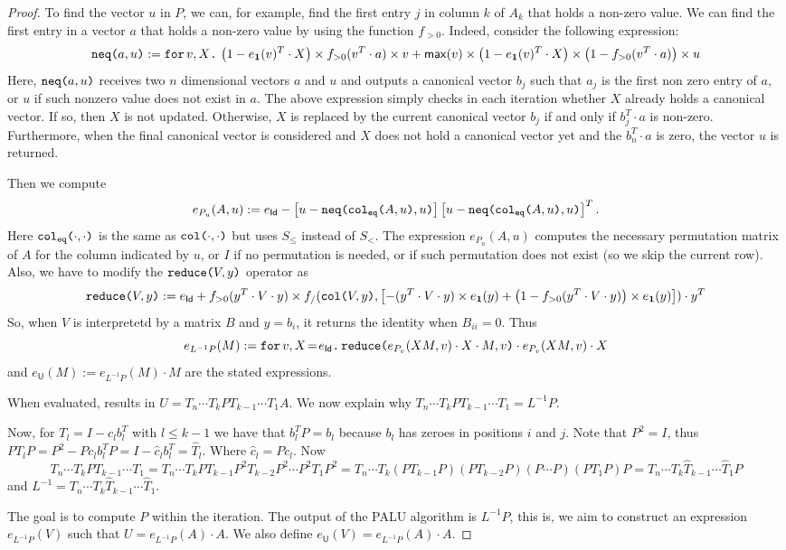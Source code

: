 \begin{proof}
To find the vector $u$ in $P$, we can, for example, find the first entry $j$ in column $k$ of $A_k$ that holds a non-zero value. We can find the first entry in a vector $a$ that holds a non-zero value by using the function $f_{>0}$. Indeed, consider the following expression:
$$
\nneq{a}{u}:=\ffor{v}{X}{\left( 1-e_{\ones}(v)^T\cdot X \right) \times f_{>0}(v^T\cdot a)\times v + \mathsf{max}(v)\times\left( 1-e_{\ones}(v)^T\cdot X \right)\times \left( 1 - f_{>0}(v^T\cdot a) \right) \times u}
$$
Here, $\nneq{a}{u}$ receives two $n$ dimensional vectors $a$ and $u$ and outputs a 
canonical vector $b_j$ such that $a_j$ is the first non zero entry of $a$, or $u$ if such nonzero value does not exist in $a$. The above expression simply checks in each iteration
whether $X$ already holds a canonical vector. If so, then $X$ is not updated. Otherwise,
$X$ is replaced by the current canonical vector $b_j$ if and only if $b_j^T\cdot a$ is non-zero. Furthermore, when the final canonical vector is considered and $X$ does not hold
a canonical vector yet and the $b_n^T\cdot a$ is zero, the vector $u$ is returned.

Then we compute 
$$
e_{P_u}(A,u) := e_{\mathsf{Id}} - \left[ u - \nneq{ \ccoleq{A}{u} }{u} \right]\left[ u - \nneq{ \ccoleq{A}{u} }{u} \right]^T.
$$ 
Here $\ccoleq{\cdot}{\cdot}$ is the same as $\ccol{\cdot}{\cdot}$ but uses $S_{\leq}$ instead of 
$S_{<}$. The expression $e_{P_u}(A,u)$ computes the necessary permutation matrix of $A$ for the column indicated by $u$, or $I$
if no permutation is needed, or if such permutation does not exist (so we skip the current row).
Also, we have to modify the $\red{V}{y}$ operator as 
$$
\red{V}{y}:= e_{\mathsf{Id}}+ f_{>0}(y^T\cdot V\cdot y)\times f_/(\ccol{V}{y},\left[ -(y^T\cdot V\cdot y)\times e_{\ones}(y) + \left( 1 - f_{>0}(y^T\cdot V\cdot y) \right)\times e_{\ones}(y) \right])\cdot y^T
$$
So, when $V$ is interpretetd by a  matrix $B$ and $y=b_i$, it returns the identity when $B_{ii}=0$.
Thus 
$$
e_{L^{-1}P}(M):=\initf{e_{\mathsf{Id}}}{v}{X}{\red{e_{P_v}(XM,v)\cdot X\cdot M}{v}\cdot e_{P_v}(XM,v)\cdot X}
$$
and $e_{\mathsf{U}}(M):=e_{L^{-1}P}(M)\cdot M$ are the stated expressions.

When evaluated,
results in $U=T_{n}\cdots T_kPT_{k-1}\cdots T_1A$. 
We now explain why $T_{n}\cdots T_kPT_{k-1}\cdots T_1 = L^{-1}P.$ 

Now, for $T_{l}=I-c_lb_l^T$ with $l\leq k-1$ we have that $b_l^TP=b_l$ because $b_l$ has zeroes in positions 
$i$ and $j$. Note that $P^2=I$, thus $PT_lP=P^2-Pc_lb_l^TP=I-\widehat{c}_lb_l^T=\widehat{T}_l.$ Where 
$\widehat{c}_l=Pc_l$. Now
$$
T_{n}\cdots T_kPT_{k-1}\cdots T_1=T_{n}\cdots T_kPT_{k-1}P^2T_{k-2}P^2\cdots P^2 T_1P^2=T_{n}\cdots T_k(PT_{k-1}P)(PT_{k-2}P)(P\cdots P)(PT_1P)P=T_{n}\cdots T_k\widehat{T}_{k-1}\cdots \widehat{T}_1P
$$
and $L^{-1} = T_{n}\cdots T_k\widehat{T}_{k-1}\cdots \widehat{T}_1$.

The goal is to compute $P$ within the iteration. The output of the PALU algorithm is $L^{-1}P$, this is, 
we aim to construct an expression $e_{L^{-1}P}(V)$ such that $U=e_{L^{-1}P}(A)\cdot A$. We also define 
$e_{\mathsf{U}}(V)=e_{L^{-1}P}(A)\cdot A$.

\end{proof}

